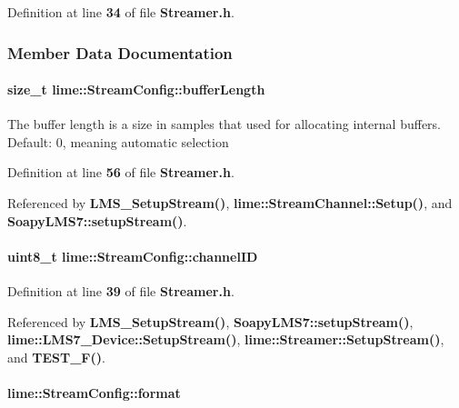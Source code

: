 Definition at line {\bf 34} of file {\bf Streamer.\+h}.



\subsubsection{Member Data Documentation}
\paragraph[{buffer\+Length}]{\setlength{\rightskip}{0pt plus 5cm}size\+\_\+t lime\+::\+Stream\+Config\+::buffer\+Length}\label{structlime_1_1StreamConfig_a5682c0779962b471990515bf19aab994}
The buffer length is a size in samples that used for allocating internal buffers. Default\+: 0, meaning automatic selection 

Definition at line {\bf 56} of file {\bf Streamer.\+h}.



Referenced by {\bf L\+M\+S\+\_\+\+Setup\+Stream()}, {\bf lime\+::\+Stream\+Channel\+::\+Setup()}, and {\bf Soapy\+L\+M\+S7\+::setup\+Stream()}.

\paragraph[{channel\+ID}]{\setlength{\rightskip}{0pt plus 5cm}uint8\+\_\+t lime\+::\+Stream\+Config\+::channel\+ID}\label{structlime_1_1StreamConfig_a40a0438ec81e5bf9c21819c8a98c0bcd}


Definition at line {\bf 39} of file {\bf Streamer.\+h}.



Referenced by {\bf L\+M\+S\+\_\+\+Setup\+Stream()}, {\bf Soapy\+L\+M\+S7\+::setup\+Stream()}, {\bf lime\+::\+L\+M\+S7\+\_\+\+Device\+::\+Setup\+Stream()}, {\bf lime\+::\+Streamer\+::\+Setup\+Stream()}, and {\bf T\+E\+S\+T\+\_\+\+F()}.

\paragraph[{format}]{ lime\+::\+Stream\+Config\+::format}\label{structlime_1_1StreamConfig_ad214cf2f2e8ba8ff3358028bafbe9382}


